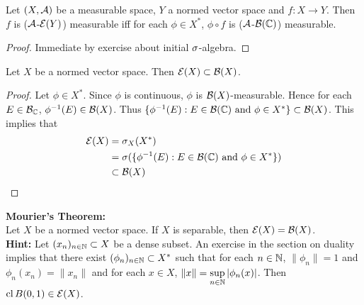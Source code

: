 \documentclass{book}
\begin{document}
	\begin{ex}
		Let $(X, \mathcal{A})$ be a measurable space, $Y$ a normed vector space and $f: X \rightarrow Y$. Then $f$ is ($\mathcal{A}$-$\mathcal{E}(Y)$) measurable iff for each $\phi \in X^*$, $\phi \circ f$ is ($\mathcal{A}$-$\mathcal{B}(\mathbb{C})$) measurable. 
	\end{ex}

	\begin{proof}
		Immediate by exercise about initial $\sigma$-algebra.
	\end{proof}
	
	\begin{ex}
		Let $X$ be a normed vector space. Then $\mathcal{E}(X) \subset \mathcal{B}(X)$.
	\end{ex}
	
	\begin{proof}
		Let $\phi \in X^*$. Since $\phi$ is continuous, $\phi$ is $\mathcal{B}(X)$-measurable. Hence for each $E \in \mathcal{B}_{\mathbb{C}}$, $\phi^{-1}(E) \in \mathcal{B}(X)$. Thus $\{ \phi^{-1}(E) : E \in \mathcal{B}(\mathbb{C}) \text{ and } \phi \in X^* \} \subset \mathcal{B}(X)$.  This implies that 
		\begin{align*}
			\mathcal{E}(X) 
			& = \sigma_X(X^*) \\
			& = \sigma(\{ \phi^{-1}(E):E \in \mathcal{B}(\mathbb{C}) \text{ and } \phi \in X^* \}) \\
			& \subset \mathcal{B}(X) 
		\end{align*} 
	\end{proof}
	
	\begin{ex} \textbf{Mourier's Theorem:} \\
		Let $X$ be a normed vector space. If $X$ is separable, then $\mathcal{E}(X) = \mathcal{B}(X)$. \\
		\textbf{Hint:} Let $(x_n)_{n \in \mathbb{N}} \subset X$ be a dense subset. An exercise in the section on duality implies that there exist $(\phi_n)_{n \in \mathbb{N}} \subset X^*$ such that for each $n \in \mathbb{N}$, $\|\phi_n\| = 1$ and $\phi_n(x_n) = \|x_n\|$ and for each $x \in X$, $\|x\| = \sup\limits_{n \in \mathbb{N}} |\phi_n(x)|$. Then $ \operatorname{cl} B(0, 1) \in \mathcal{E}(X)$.  
	\end{ex}
	
\end{document}
